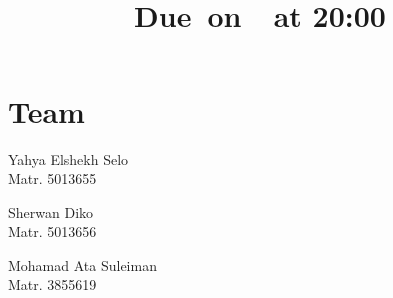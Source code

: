 \documentclass{article}
\title{
    \vspace{3in}
    \textmd{\textbf{\hmwkClass}}\\
    \normalsize\vspace{0.2in}\small{Due\ on\ \hmwkDueDate\ at 20:00}\\
    \vspace{0.2in}\large{\textit{\hmwkClassInstructor}}
    \vspace{3in}
}
\author{\hmwkAuthorName}
\begin{document}
\maketitle


\pagebreak
\tableofcontents

\section*{Team}
\begin{minipage}[t]{0.3\textwidth}
    Yahya Elshekh Selo\\
    Matr. 5013655
\end{minipage}
\hfill
\begin{minipage}[t]{0.3\textwidth}
    Sherwan Diko\\
    Matr. 5013656
\end{minipage}
\hfill
\begin{minipage}[t]{0.3\textwidth}
    Mohamad Ata Suleiman\\
    Matr. 3855619
\end{minipage}
\end{document}
